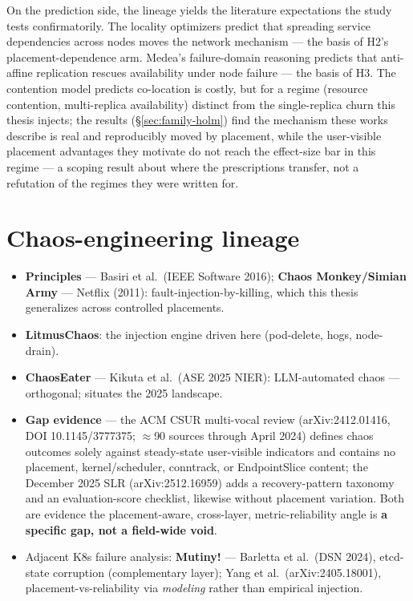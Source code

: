 On the prediction side, the lineage yields the literature expectations the
study tests confirmatorily. The locality optimizers predict that spreading
service dependencies across nodes moves the network mechanism --- the basis of
H2's placement-dependence arm. Medea's failure-domain reasoning predicts that
anti-affine replication rescues availability under node failure --- the basis of
H3. The contention model \citep{mars2011bubbleup,delimitrou2014quasar} predicts
co-location is costly, but for a regime (resource contention, multi-replica
availability) distinct from the single-replica churn this thesis injects; the
results (\S\ref{sec:family-holm}) find the mechanism these works describe is
real and reproducibly moved by placement, while the user-visible placement
advantages they motivate do not reach the effect-size bar in this regime ---
a scoping result about where the prescriptions transfer, not a refutation of the
regimes they were written for.

\section{Chaos-engineering lineage}\label{sec:chaos-lineage}

\begin{itemize}
\item \textbf{Principles} --- Basiri et al.\ (IEEE Software 2016); \textbf{Chaos
  Monkey/Simian Army} --- Netflix (2011): fault-injection-by-killing, which
  this thesis generalizes across controlled placements.
\item \textbf{LitmusChaos}: the injection engine driven here (pod-delete,
  hogs, node-drain).
\item \textbf{ChaosEater} --- Kikuta et al.\ (ASE 2025 NIER): LLM-automated chaos ---
  orthogonal; situates the 2025 landscape.
\item \textbf{Gap evidence} --- the ACM CSUR multi-vocal review (arXiv:2412.01416,
  DOI 10.1145/3777375; $\approx$90 sources through April 2024) defines chaos outcomes
  solely against steady-state user-visible indicators and contains no
  placement, kernel/scheduler, conntrack, or EndpointSlice content; the
  December 2025 SLR (arXiv:2512.16959) adds a recovery-pattern taxonomy and an
  evaluation-score checklist, likewise without placement variation. Both are
  evidence the placement-aware, cross-layer, metric-reliability angle is \textbf{a
  specific gap, not a field-wide void}.
\item Adjacent K8s failure analysis: \textbf{Mutiny!} --- Barletta et al.\ (DSN 2024),
  etcd-state corruption (complementary layer); Yang et al.\ (arXiv:2405.18001),
  placement-vs-reliability via \emph{modeling} rather than empirical injection.
\end{itemize}

